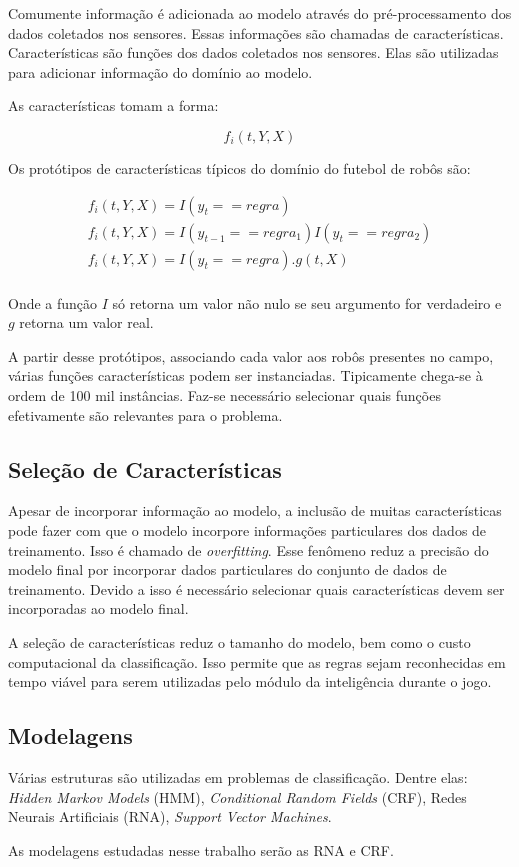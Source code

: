 Comumente informação é adicionada ao modelo através do pré-processamento dos
dados coletados nos sensores. Essas informações são chamadas de características.
Características são funções dos dados coletados nos sensores. Elas são utilizadas
para adicionar informação do domínio ao modelo.

As características tomam a forma:

\begin{centering}
\begin{equation}
f_i(t,Y,X)
\end{equation}
\end{centering}

Os protótipos de características típicos do domínio do futebol de robôs são:

\begin{centering}
\begin{eqnarray}
f_i(t,Y,X)=I(y_t == regra)\\
f_i(t,Y,X)=I(y_{t-1} == regra_1)I(y_t == regra_2)\\
f_i(t,Y,X)=I(y_t == regra).g(t,X)\\
\end{eqnarray}
\end{centering}

Onde a função $I$ só retorna um valor não nulo se seu argumento for verdadeiro e
$g$ retorna um valor real.

A partir desse protótipos, associando cada valor aos robôs presentes
no campo, várias funções características podem ser instanciadas.
Tipicamente chega-se à ordem de 100 mil instâncias. Faz-se necessário
selecionar quais funções efetivamente são relevantes para o problema.

\subsection{Seleção de Características}

Apesar de incorporar informação ao modelo, a inclusão de muitas características
pode fazer com que o modelo incorpore informações particulares dos dados de
treinamento. Isso é chamado de \textit{overfitting}. Esse fenômeno reduz a precisão
do modelo final por incorporar dados particulares do conjunto de dados de
treinamento. Devido a isso é necessário selecionar quais características devem
ser incorporadas ao modelo final.

A seleção de características reduz o tamanho do modelo, bem como o custo
computacional da classificação. Isso permite que as regras sejam reconhecidas
em tempo viável para serem utilizadas pelo módulo da inteligência durante o
jogo.

\subsection{Modelagens}

Várias estruturas são utilizadas em problemas de classificação. Dentre elas:
\textit{Hidden Markov Models} (HMM), \textit{Conditional Random Fields} (CRF),
Redes Neurais Artificiais (RNA), \textit{Support Vector Machines}.

As modelagens estudadas nesse trabalho serão as RNA e CRF.
